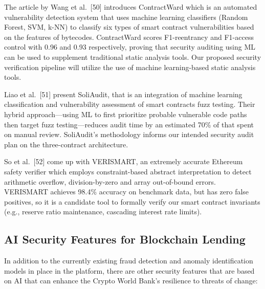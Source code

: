 \documentclass[12pt,a4paper]{report}
\begin{document}
The article by Wang et al.~[50] introduces ContractWard which is an automated vulnerability detection system that uses machine learning classifiers (Random Forest, SVM, k-NN) to classify six types of smart contract vulnerabilities based on the features of bytecodes. ContractWard scores F1-reentrancy and F1-access control with 0.96 and 0.93 respectively, proving that security auditing using ML can be used to supplement traditional static analysis tools. Our proposed security verification pipeline will utilize the use of machine learning-based static analysis tools.

Liao et al.~[51] present SoliAudit, that is an integration of machine learning classification and vulnerability assessment of smart contracts fuzz testing. Their hybrid approach---using ML to first prioritize probable vulnerable code paths then target fuzz testing---reduces audit time by an estimated 70\% of that spent on manual review. SoliAudit's methodology informs our intended security audit plan on the three-contract architecture.

So et al.~[52] come up with VERISMART, an extremely accurate Ethereum safety verifier which employs constraint-based abstract interpretation to detect arithmetic overflow, division-by-zero and array out-of-bound errors. VERISMART achieves 98.4\% accuracy on benchmark data, but has zero false positives, so it is a candidate tool to formally verify our smart contract invariants (e.g., reserve ratio maintenance, cascading interest rate limits).

\subsection{AI Security Features for Blockchain Lending}

In addition to the currently existing fraud detection and anomaly identification models in place in the platform, there are other security features that are based on AI that can enhance the Crypto World Bank's resilience to threats of change:
\end{document}
